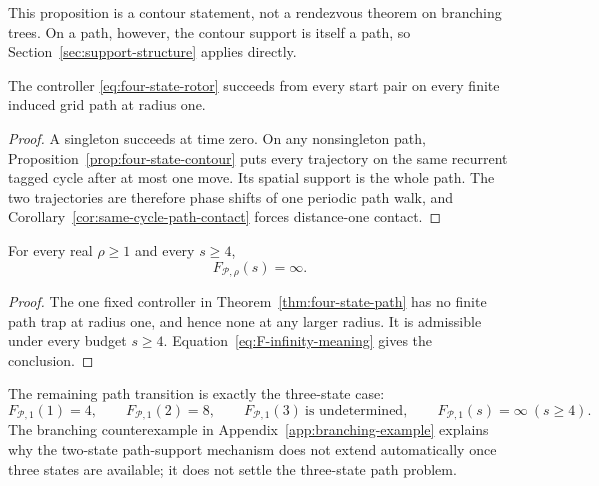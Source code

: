 This proposition is a contour statement, not a rendezvous theorem on branching trees.  On a path, however, the contour support is itself a path, so Section~\ref{sec:support-structure} applies directly.

\begin{theorem}\label{thm:four-state-path}
The controller \eqref{eq:four-state-rotor} succeeds from every start pair on every finite induced grid path at radius one.
\end{theorem}
\begin{proof}
A singleton succeeds at time zero.  On any nonsingleton path, Proposition~\ref{prop:four-state-contour} puts every trajectory on the same recurrent tagged cycle after at most one move.  Its spatial support is the whole path.  The two trajectories are therefore phase shifts of one periodic path walk, and Corollary~\ref{cor:same-cycle-path-contact} forces distance-one contact.
\end{proof}

\begin{corollary}\label{cor:path-infinity}
For every real $\rho\ge1$ and every $s\ge4$,
\[
 \boxed{F_{\mathcal P,\rho}(s)=\infty.}
\]
\end{corollary}
\begin{proof}
The one fixed controller in Theorem~\ref{thm:four-state-path} has no finite path trap at radius one, and hence none at any larger radius.  It is admissible under every budget $s\ge4$.  Equation~\eqref{eq:F-infinity-meaning} gives the conclusion.
\end{proof}

The remaining path transition is exactly the three-state case:
\[
 F_{\mathcal P,1}(1)=4,\qquad
 F_{\mathcal P,1}(2)=8,\qquad
 F_{\mathcal P,1}(3)\ \text{is undetermined},\qquad
 F_{\mathcal P,1}(s)=\infty\ (s\ge4).
\]
The branching counterexample in Appendix~\ref{app:branching-example} explains why the two-state path-support mechanism does not extend automatically once three states are available; it does not settle the three-state path problem.
